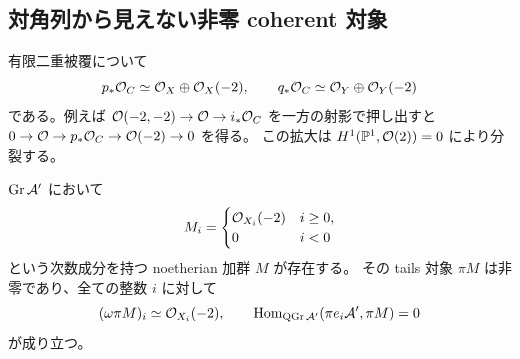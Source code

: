 \subsection{対角列から見えない非零 coherent 対象}

有限二重被覆について
\begin{equation}\label{ruled-eq:double-cover-push}
 p_*\mathcal O_C\simeq\mathcal O_X\oplus\mathcal O_X(-2),\qquad
 q_*\mathcal O_C\simeq\mathcal O_Y\oplus\mathcal O_Y(-2)
\end{equation}
である。例えば $\mathcal O(-2,-2)\to\mathcal O\to i_*\mathcal O_C$ を一方の射影で押し出すと
$0\to\mathcal O\to p_*\mathcal O_C\to\mathcal O(-2)\to0$ を得る。
この拡大は $H^1(\mathbb P^1,\mathcal O(2))=0$ により分裂する。

\begin{proposition}\label{ruled-prop:invisible-module}
$\operatorname{Gr}\mathcal A'$ において
\[
 M_i=\begin{cases}
 \mathcal O_{X_i}(-2)&i\ge0,\\
 0&i<0
 \end{cases}
\]
という次数成分を持つ noetherian 加群 $M$ が存在する。
その tails 対象 $\pi M$ は非零であり、全ての整数 $i$ に対して
\[
 (\omega\pi M)_i\simeq\mathcal O_{X_i}(-2),\qquad
 \operatorname{Hom}_{\operatorname{QGr}\mathcal A'}(\pi e_i\mathcal A',\pi M)=0
\]
が成り立つ。
\end{proposition}

